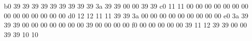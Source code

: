 {\begin{semiverbatim}
\color{HexyGreen}b0 \color{Hexy57}39 39 39 39 39 39 39 39 39 \color{Hexy58}3a \color{Hexy57}39 39 \color{Hexy0}00 00 \color{Hexy57}39 39
\color{HexyGreen}c0 \color{Hexy17}11 11 \color{Hexy0}00 00 00 00 00 00 00 00 00 00 00 00 00 00
\color{HexyGreen}d0 \color{Hexy18}12 12 \color{Hexy17}11 11 \color{Hexy57}39 39 \color{Hexy58}3a \color{Hexy0}00 00 00 00 00 00 00 00 00
\color{HexyGreen}e0 \color{Hexy58}3a \color{Hexy57}39 39 39 \color{Hexy0}00 00 00 00 00 00 00 \color{Hexy57}39 \color{Hexy0}00 00 00 00
\color{HexyGreen}f0 \color{Hexy0}00 00 00 00 00 \color{Hexy57}39 \color{Hexy17}11 \color{Hexy18}12 \color{Hexy57}39 39 \color{Hexy0}00 00 \color{Hexy57}39 39 \color{Hexy16}10 10
\end{semiverbatim}
}
